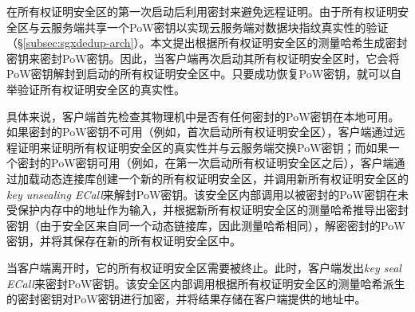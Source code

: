 \sysnameS 在所有权证明安全区的第一次启动后利用密封来避免远程证明。由于所有权证明安全区与云服务端共享一个PoW密钥以实现云服务端对数据块指纹真实性的验证（\S\ref{subsec:sgxdedup-arch}）。本文提出根据所有权证明安全区的测量哈希生成密封密钥来密封PoW密钥。因此，当客户端再次启动其所有权证明安全区时，它会将PoW密钥解封到启动的所有权证明安全区中。只要成功恢复PoW密钥，就可以自举验证所有权证明安全区的真实性。

具体来说，客户端首先检查其物理机中是否有任何密封的PoW密钥在本地可用。如果密封的PoW密钥不可用（例如，首次启动所有权证明安全区），客户端通过远程证明来证明所有权证明安全区的真实性并与云服务端交换PoW密钥；而如果一个密封的PoW密钥可用（例如，在第一次启动所有权证明安全区之后），客户端通过加载动态连接库创建一个新的所有权证明安全区，并调用新所有权证明安全区的 \textit{key unsealing ECall}来解封PoW密钥。该安全区内部调用以被密封的PoW密钥在未受保护内存中的地址作为输入，并根据新所有权证明安全区的测量哈希推导出密封密钥（由于安全区来自同一个动态链接库，因此测量哈希相同），解密密封的PoW密钥，并将其保存在新的所有权证明安全区中。

当客户端离开\sysnameS 时，它​​的所有权证明安全区需要被终止。此时，客户端发出\textit{key seal ECall}来密封PoW密钥。该安全区内部调用根据所有权证明安全区的测量哈希派生的密封密钥对PoW密钥进行加密，并将结果存储在客户端提供的地址中。